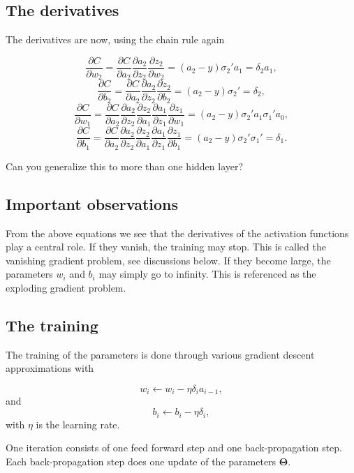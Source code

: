 \documentclass[%
oneside,                 %
final,                   %
10pt]{article}
\begin{document}
\subsection{The derivatives}

The derivatives are now, using the chain rule again

\[
\frac{\partial C}{\partial w_2}=\frac{\partial C}{\partial a_2}\frac{\partial a_2}{\partial z_2}\frac{\partial z_2}{\partial w_2}=(a_2-y)\sigma_2'a_1=\delta_2a_1,
\]
\[
\frac{\partial C}{\partial b_2}=\frac{\partial C}{\partial a_2}\frac{\partial a_2}{\partial z_2}\frac{\partial z_2}{\partial b_2}=(a_2-y)\sigma_2'=\delta_2,
\]
\[
\frac{\partial C}{\partial w_1}=\frac{\partial C}{\partial a_2}\frac{\partial a_2}{\partial z_2}\frac{\partial z_2}{\partial a_1}\frac{\partial a_1}{\partial z_1}\frac{\partial z_1}{\partial w_1}=(a_2-y)\sigma_2'a_1\sigma_1'a_0,
\]
\[
\frac{\partial C}{\partial b_1}=\frac{\partial C}{\partial a_2}\frac{\partial a_2}{\partial z_2}\frac{\partial z_2}{\partial a_1}\frac{\partial a_1}{\partial z_1}\frac{\partial z_1}{\partial b_1}=(a_2-y)\sigma_2'\sigma_1'=\delta_1.
\]

Can you generalize this to more than one hidden layer?

\subsection{Important observations}

\begin{block}{}
From the above equations we see that the derivatives of the activation
functions play a central role. If they vanish, the training may
stop. This is called the vanishing gradient problem, see discussions below. If they become
large, the parameters $w_i$ and $b_i$ may simply go to infinity. This
is referenced as  the exploding gradient problem.
\end{block}

\subsection{The training}

The training of the parameters is done through various gradient descent approximations with

\[
w_{i}\leftarrow w_{i}- \eta \delta_i a_{i-1},
\]
and
\[
b_i \leftarrow b_i-\eta \delta_i,
\]
with $\eta$ is the learning rate.

One iteration consists of one feed forward step and one back-propagation step. Each back-propagation step does one update of the parameters $\bm{\Theta}$.
\end{document}
